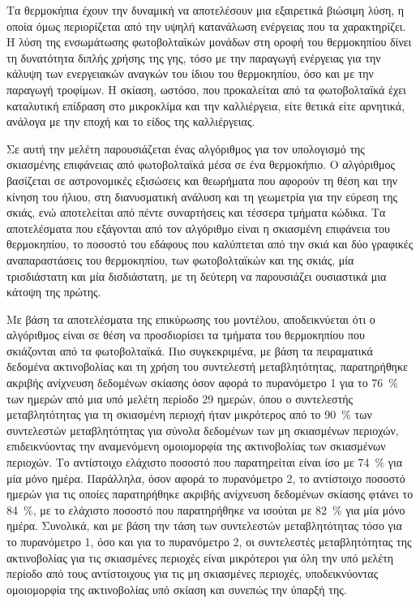 \documentclass[12pt, a4paper]{report} %
\begin{document}
Τα θερμοκήπια έχουν την δυναμική να αποτελέσουν μια εξαιρετικά βιώσιμη λύση, η οποία όμως περιορίζεται από την υψηλή 
κατανάλωση ενέργειας που τα χαρακτηρίζει. Η λύση της ενσωμάτωσης φωτοβολταϊκών μονάδων στη οροφή του θερμοκηπίου δίνει 
τη δυνατότητα διπλής χρήσης της γης, τόσο με την παραγωγή ενέργειας για την κάλυψη των ενεργειακών αναγκών του ίδιου του 
θερμοκηπίου, όσο και με την παραγωγή τροφίμων. Η σκίαση, ωστόσο, που προκαλείται από τα φωτοβολταϊκά έχει καταλυτική 
επίδραση στο μικροκλίμα και την καλλιέργεια, είτε θετικά είτε αρνητικά, ανάλογα με την εποχή και το είδος της καλλιέργειας.

Σε αυτή την μελέτη παρουσιάζεται ένας αλγόριθμος για τον υπολογισμό της σκιασμένης επιφάνειας από φωτοβολταϊκά μέσα σε 
ένα θερμοκήπιο. Ο αλγόριθμος βασίζεται σε αστρονομικές εξισώσεις και θεωρήματα που αφορούν τη θέση και την κίνηση του 
ήλιου, στη διανυσματική ανάλυση και τη γεωμετρία για την εύρεση της σκιάς, ενώ αποτελείται από πέντε συναρτήσεις και 
τέσσερα τμήματα κώδικα. Τα αποτελέσματα που εξάγονται από τον αλγόριθμο είναι η σκιασμένη επιφάνεια του θερμοκηπίου, το 
ποσοστό του εδάφους που καλύπτεται από την σκιά και δύο γραφικές αναπαραστάσεις του θερμοκηπίου, των φωτοβολταϊκών και 
της σκιάς, μία τρισδιάστατη και μία δισδιάστατη, με τη δεύτερη να παρουσιάζει ουσιαστικά μια κάτοψη της πρώτης.

Με βάση τα αποτελέσματα της επικύρωσης του μοντέλου, αποδεικνύεται ότι ο αλγόριθμος είναι σε θέση να προσδιορίσει τα 
τμήματα του θερμοκηπίου που σκιάζονται από τα φωτοβολταϊκά. Πιο συγκεκριμένα, με βάση τα πειραματικά δεδομένα ακτινοβολίας 
και τη χρήση του συντελεστή μεταβλητότητας, παρατηρήθηκε ακριβής ανίχνευση δεδομένων σκίασης όσον αφορά το πυρανόμετρο 1 
για το \SI{76}{\percent} των ημερών από μια υπό μελέτη περίοδο 29 ημερών, όπου ο συντελεστής μεταβλητότητας για τη 
σκιασμένη περιοχή ήταν μικρότερος από το \SI{90}{\percent} των συντελεστών μεταβλητότητας για σύνολα δεδομένων των μη 
σκιασμένων περιοχών,  επιδεικνύοντας την αναμενόμενη ομοιομορφία της ακτινοβολίας των σκιασμένων περιοχών. Το αντίστοιχο 
ελάχιστο ποσοστό που παρατηρείται είναι ίσο με \SI{74}{\percent} για μία μόνο ημέρα. Παράλληλα, όσον αφορά το πυρανόμετρο 
2, το αντίστοιχο ποσοστό ημερών για τις οποίες παρατηρήθηκε ακριβής ανίχνευση δεδομένων σκίασης φτάνει το \SI{84}{\percent}, 
με το ελάχιστο ποσοστό που παρατηρήθηκε να ισούται με \SI{82}{\percent} για μία μόνο ημέρα. Συνολικά, και με βάση την τάση 
των συντελεστών μεταβλητότητας τόσο για το πυρανόμετρο 1, όσο και για το πυρανόμετρο 2, οι συντελεστές μεταβλητότητας της 
ακτινοβολίας για τις σκιασμένες περιοχές είναι μικρότεροι για όλη την υπό μελέτη περίοδο από τους αντίστοιχους για τις μη 
σκιασμένες περιοχές, υποδεικνύοντας ομοιομορφία της ακτινοβολίας υπό σκίαση και συνεπώς την ύπαρξή της.
\end{document}
